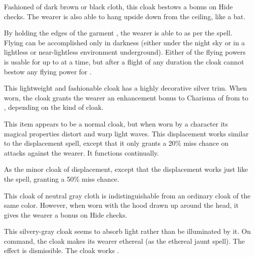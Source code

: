  Fashioned of dark brown or black cloth, this cloak bestows a   bonus on Hide checks. The wearer is also able to hang upside down from the ceiling, like a bat.

By holding the edges of the garment , the wearer is able to  as per the spell. Flying can be accomplished only in darkness (either under the night sky or in a lightless or near-lightless environment underground). Either of the flying powers is usable for up to  at a time, but after a flight of any duration the cloak cannot bestow any flying power for .

 This lightweight and fashionable cloak has a highly decorative silver trim. When worn, the cloak grants the wearer an enhancement bonus to Charisma of from  to , depending on the kind of cloak.

 This item appears to be a normal cloak, but when worn by a character its magical properties distort and warp light waves. This displacement works similar to the displacement spell, except that it only grants a 20\% miss chance on attacks against the wearer. It functions continually.

 As the minor cloak of displacement, except that the displacement works just like the  spell, granting a 50\% miss chance.

 This cloak of neutral gray cloth is indistinguishable from an ordinary cloak of the same color. However, when worn with the hood drawn up around the head, it gives the wearer a   bonus on Hide checks.

 This silvery-gray cloak seems to absorb light rather than be illuminated by it. On command, the cloak makes its wearer ethereal (as the ethereal jaunt spell). The effect is dismissible. The cloak works .

